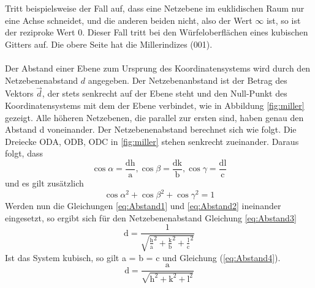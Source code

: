 Tritt  beispielsweise der Fall auf, dass eine Netzebene im euklidischen Raum nur eine Achse schneidet, und die anderen beiden nicht, also der Wert $\infty$ ist, so ist der reziproke Wert 0. 
Dieser Fall tritt bei den Würfeloberflächen eines kubischen Gitters auf. 
Die obere Seite hat die Millerindizes (001).\\\\
Der Abstand einer Ebene zum Ursprung des Koordinatensystems wird durch den Netzebenenabstand $d$ angegeben.
Der Netzebenanbstand ist der Betrag des Vektors $\vec{d}$, der stets senkrecht auf der Ebene steht und den Null-Punkt des Koordinatensystems mit dem der Ebene verbindet, wie in Abbildung \ref{fig:miller} gezeigt.
Alle höheren Netzebenen, die parallel zur ersten sind, haben genau den Abstand d voneinander.
Der Netzebenenabstand berechnet sich wie folgt.
Die Dreiecke ODA, ODB, ODC in \ref{fig:miller} stehen senkrecht zueinander. Daraus folgt, dass
\begin{equation}
\cos{\alpha} = \frac{\text{d}\text{h}}{\text{a}}, \cos{\beta} = \frac{\text{d}\text{k}}{\text{b}}, \cos{\gamma} = \frac{\text{d}\text{l}}{\text{c}}
\label{eq:Abstand1}
\end{equation}
 und es gilt zusätzlich
\begin{equation}
\cos{\alpha}^2+\cos{\beta}^2+\cos{\gamma}^2 = 1
\label{eq:Abstand2}
\end{equation}
Werden nun die Gleichungen \ref{eq:Abstand1} und \ref{eq:Abstand2} ineinander eingesetzt, so ergibt sich für den Netzebenenabstand Gleichung \ref{eq:Abstand3}
\begin{equation}
\text{d} = \frac{1}{\sqrt{\frac{\text{h}}{\text{a}}^2+\frac{\text{k}}{\text{b}}^2+\frac{\text{l}}{\text{c}}^2}}
\label{eq:Abstand3}
\end{equation}
Ist das System kubisch, so gilt a = b = c und Gleichung (\ref{eq:Abstand4}).
\begin{equation}
\text{d} = \frac{\text{a}}{\sqrt{\text{h}^2+\text{k}^2+\text{l}^2}}
\label{eq:Abstand4}
\end{equation}

